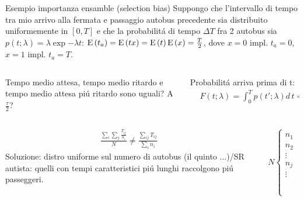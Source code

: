 \documentclass[asd-beamer.tex]{subfiles}%
\begin{document}
\begin{wordonframe}{Esempio importanza ensamble (selection bias)}
    Suppongo che l'intervallo di tempo tra mio arrivo alla fermata e passaggio autobus precedente sia distribuito uniformemente in $[0,T]$ e che la probabilit\'a di tempo $\Delta T$ fra 2 autobus sia  $p(t;\lambda)=\lambda\exp{-\lambda t}$: $\operatorname{E}{(t_a)}=\operatorname{E}{(tx)}=\operatorname{E}{(t)}\operatorname{E}{(x)}=\frac{T}{2}$, dove $x=0$ impl. $t_a=0$, $x=1$ impl. $t_a=T$.
	\begin{columns}[T]
		\begin{column}{0.4\textwidth}
			Tempo medio attesa, tempo medio ritardo e tempo medio attesa pi\'u ritardo sono uguali? A $\frac{\tau}{2}$?
		\end{column}
		\begin{column}{0.6\textwidth}
			Probabilit\'a arriva prima di t:
			\begin{align*}
			&F(t;\lambda)=\int_0^Tp(t';\lambda)d\,t=1-F(T)=1-\exp{-\lambda T}
			\end{align*}
		\end{column}
	\end{columns}
	\begin{columns}[T]
		\begin{column}{0.55\textwidth}
			\begin{align*}
			&\frac{\sum_i\sum_j\frac{T_{ij}}{n_i}}{N}\neq\frac{\sum_{ij}T_{ij}}{\sum_in_i}
			\end{align*}
			Soluzione: distro uniforme sul numero di autobus (il quinto ...)/SR autista: quelli con tempi caratteristici pi\'u lunghi raccolgono pi\'u passeggeri.
		\end{column}
		\begin{column}{0.45\textwidth}
			\begin{align*}
			&N\left\{\begin{array}{cccc}
			n_1&T_1&\ldots&T_{n_1}\\
			n_2&&&\\
			\vdots&&&\\
			n_j&&&\\
			\vdots&&&\\
			&\frac{T}{2}&\ldots&\frac{T}{2}\\
			\end{array}\right.
			\end{align*}
		\end{column}
	\end{columns}
\end{wordonframe}
\end{document}
